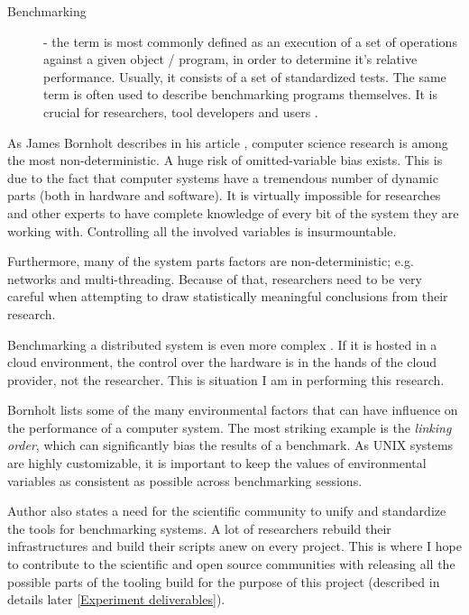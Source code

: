 \documentclass{uvamscse}
\begin{document}
\begin{description}
  \item[Benchmarking]
  - the term is most commonly defined as an execution of a set of operations against a given object / program, in order to determine it's relative performance. Usually, it consists of a set of standardized tests. The same term is often used to describe benchmarking programs themselves. It is crucial for researchers, tool developers and users \cite{BenRM}.
\end{description}

As James Bornholt describes in his article \cite{BornBen}, computer science research is among the most non-deterministic. A huge risk of omitted-variable bias exists. This is due to the fact that computer systems have a tremendous number of dynamic parts (both in hardware and software). It is virtually impossible for researches and other experts to have complete knowledge of every bit of the system they are working with. Controlling all the involved variables is insurmountable.

Furthermore, many of the system parts factors are non-deterministic; e.g. networks and multi-threading. Because of that, researchers need to be very careful when attempting to draw statistically meaningful conclusions from their research.

Benchmarking a distributed system is even more complex \cite{BornBen}. If it is hosted in a cloud environment, the control over the hardware is in the hands of the cloud provider, not the researcher. This is situation I am in performing this research.

Bornholt \cite{BornBen} lists some of the many environmental factors that can have influence on the performance of a computer system. The most striking example is the \textit{linking order}, which can significantly bias the results of a benchmark. As UNIX systems are highly customizable, it is important to keep the values of environmental variables as consistent as possible across benchmarking sessions.

Author also states a need for the scientific community to unify and standardize the tools for benchmarking systems. A lot of researchers rebuild their infrastructures and build their scripts anew on every project. This is where I hope to contribute to the scientific and open source communities with releasing all the possible parts of the tooling build for the purpose of this project (described in details later \ref{Experiment deliverables}).
\end{document}
